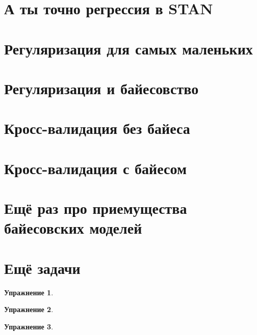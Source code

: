 \documentclass[12pt, a4paper, oneside]{extreport}
\theoremstyle{plain}              %
\theoremstyle{definition}         %
\newtheorem{problem}{\color{myblue} Упражнение}
\begin{document}
\section{А ты точно регрессия в STAN} 


\section{Регуляризация для самых маленьких}


\section{Регуляризация и байесовство} 


\section{Кросс-валидация без байеса} 


\section{Кросс-валидация с байесом} 


\section{Ещё раз про приемущества байесовских моделей} 


\section{Ещё задачи} 


\begin{problem}
	
	
	\begin{sol} 
		
		
	\end{sol} 
\end{problem}


\begin{problem}
	
	
	\begin{sol} 
		
		
	\end{sol} 
\end{problem}


\begin{problem}
	
	
	\begin{sol} 
		
		
	\end{sol} 
\end{problem}
\end{document}

